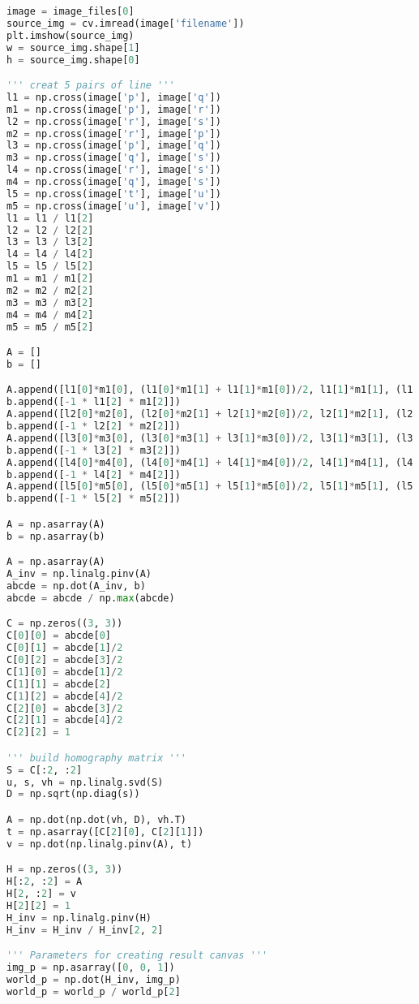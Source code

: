 \documentclass[11pt]{article}
\begin{document}
\begin{lstlisting}[language=Python, showstringspaces=false]
image = image_files[0]
source_img = cv.imread(image['filename'])
plt.imshow(source_img)
w = source_img.shape[1]
h = source_img.shape[0]

''' creat 5 pairs of line '''
l1 = np.cross(image['p'], image['q'])
m1 = np.cross(image['p'], image['r'])
l2 = np.cross(image['r'], image['s'])
m2 = np.cross(image['r'], image['p'])
l3 = np.cross(image['p'], image['q'])
m3 = np.cross(image['q'], image['s'])
l4 = np.cross(image['r'], image['s'])
m4 = np.cross(image['q'], image['s'])
l5 = np.cross(image['t'], image['u'])
m5 = np.cross(image['u'], image['v'])
l1 = l1 / l1[2]
l2 = l2 / l2[2]
l3 = l3 / l3[2]
l4 = l4 / l4[2]
l5 = l5 / l5[2]
m1 = m1 / m1[2]
m2 = m2 / m2[2]
m3 = m3 / m3[2]
m4 = m4 / m4[2]
m5 = m5 / m5[2]

A = []
b = []

A.append([l1[0]*m1[0], (l1[0]*m1[1] + l1[1]*m1[0])/2, l1[1]*m1[1], (l1[0]*m1[2] + l1[2]*m1[0])/2, (l1[1]*m1[2] + l1[2]*m1[1])/2])
b.append([-1 * l1[2] * m1[2]])
A.append([l2[0]*m2[0], (l2[0]*m2[1] + l2[1]*m2[0])/2, l2[1]*m2[1], (l2[0]*m2[2] + l2[2]*m2[0])/2, (l2[1]*m2[2] + l2[2]*m2[1])/2])
b.append([-1 * l2[2] * m2[2]])
A.append([l3[0]*m3[0], (l3[0]*m3[1] + l3[1]*m3[0])/2, l3[1]*m3[1], (l3[0]*m3[2] + l3[2]*m3[0])/2, (l3[1]*m3[2] + l3[2]*m3[1])/2])
b.append([-1 * l3[2] * m3[2]])
A.append([l4[0]*m4[0], (l4[0]*m4[1] + l4[1]*m4[0])/2, l4[1]*m4[1], (l4[0]*m4[2] + l4[2]*m4[0])/2, (l4[1]*m4[2] + l4[2]*m4[1])/2])
b.append([-1 * l4[2] * m4[2]])
A.append([l5[0]*m5[0], (l5[0]*m5[1] + l5[1]*m5[0])/2, l5[1]*m5[1], (l5[0]*m5[2] + l5[2]*m5[0])/2, (l5[1]*m5[2] + l5[2]*m5[1])/2])
b.append([-1 * l5[2] * m5[2]])

A = np.asarray(A)
b = np.asarray(b)

A = np.asarray(A)
A_inv = np.linalg.pinv(A)
abcde = np.dot(A_inv, b)
abcde = abcde / np.max(abcde)

C = np.zeros((3, 3))
C[0][0] = abcde[0]
C[0][1] = abcde[1]/2
C[0][2] = abcde[3]/2
C[1][0] = abcde[1]/2
C[1][1] = abcde[2]
C[1][2] = abcde[4]/2
C[2][0] = abcde[3]/2
C[2][1] = abcde[4]/2
C[2][2] = 1

''' build homography matrix '''
S = C[:2, :2]
u, s, vh = np.linalg.svd(S)
D = np.sqrt(np.diag(s))

A = np.dot(np.dot(vh, D), vh.T)
t = np.asarray([C[2][0], C[2][1]])
v = np.dot(np.linalg.pinv(A), t)

H = np.zeros((3, 3))
H[:2, :2] = A
H[2, :2] = v
H[2][2] = 1
H_inv = np.linalg.pinv(H)
H_inv = H_inv / H_inv[2, 2]

''' Parameters for creating result canvas '''
img_p = np.asarray([0, 0, 1])
world_p = np.dot(H_inv, img_p)
world_p = world_p / world_p[2]


\end{lstlisting}
\end{document}
